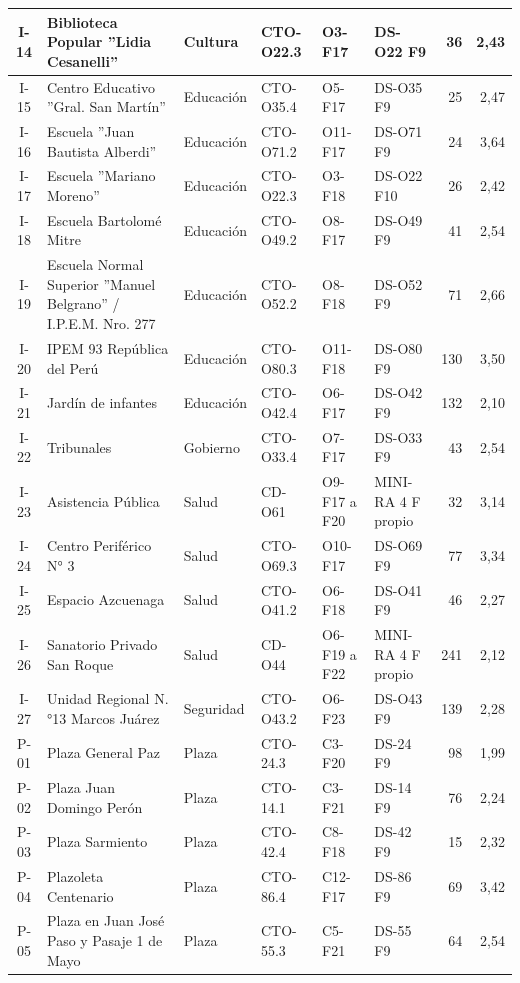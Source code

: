 \begin{longtable}{|c|>{\raggedright\arraybackslash}p{3.3cm}|l|l|>{\raggedright\arraybackslash}p{1.6cm}|>{\raggedright\arraybackslash}p{1.9cm}|r|r|}
I-14 & Biblioteca Popular ''Lidia Cesanelli'' & Cultura & CTO-O22.3 & O3-F17 & DS-O22 F9 & 36 & 2{,}43 \\ \hline
I-15 & Centro Educativo ''Gral. San Martín'' & Educación & CTO-O35.4 & O5-F17 & DS-O35 F9 & 25 & 2{,}47 \\ \hline
I-16 & Escuela ''Juan Bautista Alberdi'' & Educación & CTO-O71.2 & O11-F17 & DS-O71 F9 & 24 & 3{,}64 \\ \hline
I-17 & Escuela ''Mariano Moreno'' & Educación & CTO-O22.3 & O3-F18 & DS-O22 F10 & 26 & 2{,}42 \\ \hline
I-18 & Escuela Bartolomé Mitre & Educación & CTO-O49.2 & O8-F17 & DS-O49 F9 & 41 & 2{,}54 \\ \hline
I-19 & Escuela Normal Superior ''Manuel Belgrano'' / I.P.E.M. Nro. 277 & Educación & CTO-O52.2 & O8-F18 & DS-O52 F9 & 71 & 2{,}66 \\ \hline
I-20 & IPEM 93 República del Perú & Educación & CTO-O80.3 & O11-F18 & DS-O80 F9 & 130 & 3{,}50 \\ \hline
I-21 & Jardín de infantes & Educación & CTO-O42.4 & O6-F17 & DS-O42 F9 & 132 & 2{,}10 \\ \hline
I-22 & Tribunales & Gobierno & CTO-O33.4 & O7-F17 & DS-O33 F9 & 43 & 2{,}54 \\ \hline
I-23 & Asistencia Pública & Salud & CD-O61 & O9-F17 a F20 & MINI-RA 4 F propio & 32 & 3{,}14 \\ \hline
I-24 & Centro Periférico N° 3 & Salud & CTO-O69.3 & O10-F17 & DS-O69 F9 & 77 & 3{,}34 \\ \hline
I-25 & Espacio Azcuenaga & Salud & CTO-O41.2 & O6-F18 & DS-O41 F9 & 46 & 2{,}27 \\ \hline
I-26 & Sanatorio Privado San Roque & Salud & CD-O44 & O6-F19 a F22 & MINI-RA 4 F propio & 241 & 2{,}12 \\ \hline
I-27 & Unidad Regional N.°13 Marcos Juárez & Seguridad & CTO-O43.2 & O6-F23 & DS-O43 F9 & 139 & 2{,}28 \\ \hline
P-01 & Plaza General Paz & Plaza & CTO-24.3 & C3-F20 & DS-24 F9 & 98 & 1{,}99 \\ \hline
P-02 & Plaza Juan Domingo Perón & Plaza & CTO-14.1 & C3-F21 & DS-14 F9 & 76 & 2{,}24 \\ \hline
P-03 & Plaza Sarmiento & Plaza & CTO-42.4 & C8-F18 & DS-42 F9 & 15 & 2{,}32 \\ \hline
P-04 & Plazoleta Centenario & Plaza & CTO-86.4 & C12-F17 & DS-86 F9 & 69 & 3{,}42 \\ \hline
P-05 & Plaza en Juan José Paso y Pasaje 1 de Mayo & Plaza & CTO-55.3 & C5-F21 & DS-55 F9 & 64 & 2{,}54 \\ \hline

\end{longtable}
